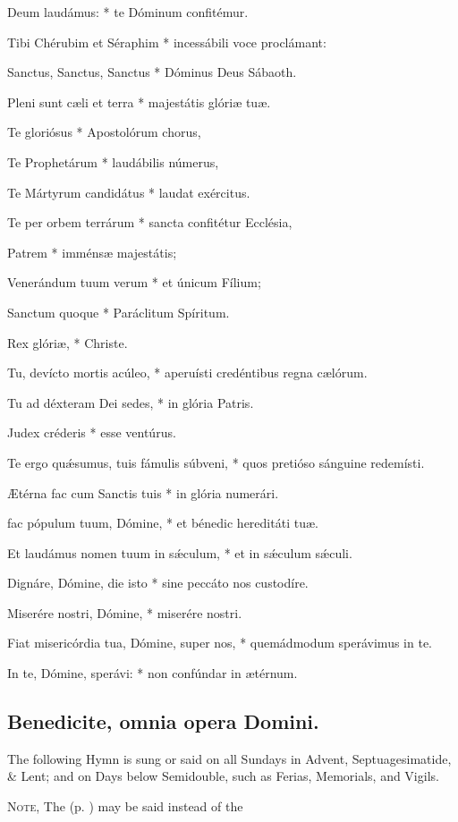 { Deum laudámus: * te Dóminum confitémur.\par
{}
Tibi Chérubim et Séraphim * incessábili voce proclámant:\par
Sanctus, Sanctus, Sanctus * Dóminus Deus Sábaoth.\par
Pleni sunt c{\ae}li et terra * majestátis glóri{\ae} tu{\ae}.\par
Te gloriósus * Apostolórum chorus,\par
Te Prophetárum * laudábilis númerus,\par
Te Mártyrum candidátus * laudat exércitus.\par
Te per orbem terrárum * sancta confitétur Ecclésia,\par
Patrem * imméns{\ae} majestátis;\par
Venerándum tuum verum * et únicum Fílium;\par
Sanctum quoque * Paráclitum Spíritum.

 Rex glóri{\ae}, * Christe.\par
{}
Tu, devícto mortis acúleo, * aperuísti credéntibus regna c{\ae}lórum.\par
Tu ad déxteram Dei sedes, * in glória Patris.\par
Judex créderis * esse ventúrus. \par
Te ergo quǽsumus, tuis fámulis súbveni, * quos pretióso sánguine redemísti.\par
{\AE}térna fac cum Sanctis tuis * in glória numerári.\par
{} fac pópulum tuum, Dómine, * et bénedic hereditáti tu{\ae}.\par
{}
Et laudámus nomen tuum in sǽculum, * et in sǽculum sǽculi.\par
Dignáre, Dómine, die isto * sine peccáto nos custodíre.\par
Miserére nostri, Dómine, * miserére nostri.\par
Fiat misericórdia tua, Dómine, super nos, * quemádmodum sperávimus in te.\par
In te, Dómine, sperávi: * non confúndar in {\ae}térnum.}


\subsection{Benedicite, omnia opera Domini.}
\begin{rubric}
The following Hymn is sung or said on all Sundays in Advent, Septuagesimatide, \& Lent; and on Days below Semidouble, such as Ferias, Memorials, and Vigils.
\end{rubric}
\begin{rubric}
	\textsc{Note,} The  (p. \pageref{OT}) may be said instead of the 
\end{rubric}

